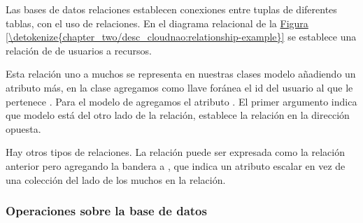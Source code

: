 Las bases de datos relaciones establecen conexiones entre tuplas de diferentes
tablas, con el uso de relaciones. En el diagrama relacional de la \hyperref[\detokenize{chapter_two/desc_cloudnao:relationship-example}]{Figura \ref{\detokenize{chapter_two/desc_cloudnao:relationship-example}}}
se establece una relación de  de usuarios a recursos.

Esta relación uno a muchos se representa en nuestras clases modelo añadiendo
un atributo más, en la clase  agregamos como
llave foránea el id del usuario al que le
pertenece .
Para el modelo de  agregamos el atributo
. El primer argumento
indica que modelo está del otro lado de la relación,  establece la
relación en la dirección opuesta.

Hay otros tipos de relaciones. La relación   puede ser expresada
como la relación anterior pero agregando la bandera  a
, que indica  un atributo escalar en vez de una colección
del lado de los muchos en la relación.


\subsubsection{Operaciones sobre la base de datos}
\label{\detokenize{chapter_two/desc_cloudnao:operaciones-sobre-la-base-de-datos}}

